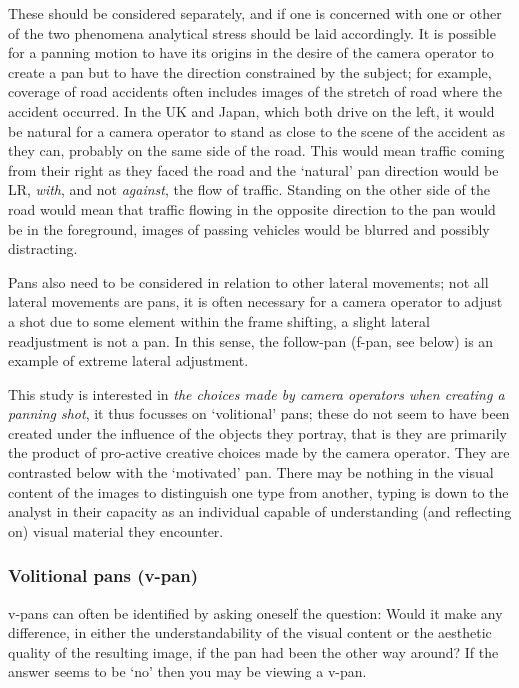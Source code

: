 \documentclass[11pt, oneside, a4paper]{scrartcl}
\begin{document}
These should be considered separately, and if one is concerned with one or other of the two phenomena analytical stress should be laid accordingly. It is possible for a panning motion to have its origins in the desire of the camera operator to create a pan but to have the direction constrained by the subject; for example, coverage of road accidents\label{item:accident} often includes images of the stretch of road where the accident occurred. In the UK and Japan, which both drive on the left, it would be  natural for a camera operator to stand as close to the scene of the accident as they can, probably on the same side of the road. This would mean traffic coming from their right as they faced the road and the `natural' pan direction would be LR, \emph{with}, and not \emph{against}, the flow of traffic. Standing on the other side of the road would mean that traffic flowing in the opposite direction to the pan would be in the foreground, images of passing vehicles would be blurred and possibly distracting.

Pans also need to be considered in relation to other lateral movements; not all lateral movements are pans, it is often necessary for a camera operator to adjust a shot due to some element within the frame shifting, a slight lateral readjustment is not a pan. In this sense, the follow-pan ({\sc f-pan}, see below) is an example of extreme lateral adjustment.

This study is interested in \emph{the choices made by camera operators when creating a panning shot}, it thus focusses on `volitional' pans; these do not seem to have been created under the influence of the objects they portray, that is they are primarily the product of pro-active creative choices made by the camera operator. They are contrasted below with the `motivated' pan. There may be nothing in the visual content of the images to distinguish one type from another, typing is down to the analyst in their capacity as an individual capable of understanding (and reflecting on) visual material they encounter.

\subsubsection{Volitional pans ({\sc v-pan})} 
{\sc v-pan}s can often be identified by asking oneself the question: Would it make any difference, in either the understandability of the visual content or the aesthetic quality of the resulting image, if the pan had been the other way around? If the answer seems to be `no' then you may be viewing a {\sc v-pan}.
\end{document}
